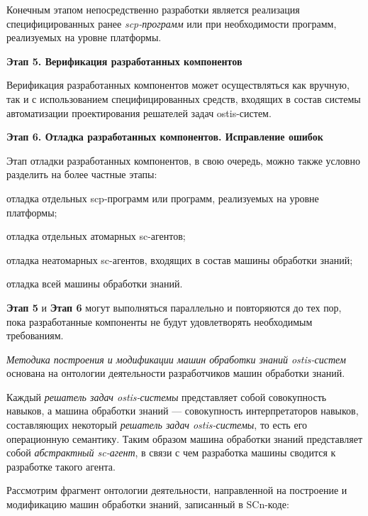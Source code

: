 Конечным этапом непосредственно разработки является реализация специфицированных ранее \textit{scp-программ} или при необходимости программ, реализуемых на уровне платформы.

\textbf{Этап 5. Верификация разработанных компонентов}

Верификация разработанных компонентов может осуществляться как вручную, так и с использованием специфицированных средств, входящих в состав системы автоматизации проектирования решателей задач ostis-систем.

\textbf{Этап 6. Отладка разработанных компонентов. Исправление ошибок}

Этап отладки разработанных компонентов, в свою очередь, можно также условно разделить на более частные этапы:

\begin{textitemize}
    \item отладка отдельных scp-программ или программ, реализуемых на уровне платформы;
    \item отладка отдельных атомарных sc-агентов;
    \item отладка неатомарных sc-агентов, входящих в состав машины обработки знаний;
    \item отладка всей машины обработки знаний.
\end{textitemize}

\textbf{Этап 5} и \textbf{Этап 6} могут выполняться параллельно и повторяются до тех пор, пока разработанные компоненты не будут удовлетворять необходимым требованиям.

\textit{Методика построения и модификации машин обработки знаний ostis-систем} основана на онтологии деятельности разработчиков машин обработки знаний.

Каждый \textit{решатель задач ostis-системы} представляет собой совокупность навыков, а машина обработки знаний --- совокупность интерпретаторов навыков, составляющих некоторый \textit{решатель задач ostis-системы}, то есть его операционную семантику. Таким образом машина обработки знаний представляет собой \textit{абстрактный sc-агент}, в связи с чем разработка машины сводится к разработке такого агента.

Рассмотрим фрагмент онтологии деятельности, направленной на построение и модификацию машин обработки знаний, записанный в SCn-коде:

